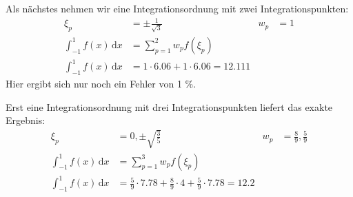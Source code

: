 \documentclass[letterpaper,10pt,german]{jupyterBook}
\begin{document}
\sphinxAtStartPar
Als nächstes nehmen wir eine Integrationsordnung mit zwei Integrationspunkten:
\begin{align*}
\xi_p &= \pm \frac{1}{\sqrt{3}} & w_p &= 1 \\
\int_{-1}^{1} f(x) \, \mathrm{d}x &= \sum_{p=1}^{2} w_p f(\xi_p)  \\
\int_{-1}^{1} f(x) \, \mathrm{d}x &= 1 \cdot 6.06  + 1 \cdot 6.06 = 12.111
\end{align*}
\sphinxAtStartPar
Hier ergibt sich nur noch ein Fehler von 1 \%.

\sphinxAtStartPar
Erst eine Integrationsordnung mit drei Integrationspunkten liefert das exakte Ergebnis:
\begin{align*}
\xi_p &= 0, \pm \sqrt{\frac{3}{5}} & w_p &= \frac{8}{9}, \frac{5}{9} \\
\int_{-1}^{1} f(x) \, \mathrm{d}x &= \sum_{p=1}^{3} w_p f(\xi_p) \\
\int_{-1}^{1} f(x) \, \mathrm{d}x &= \frac{5}{9} \cdot 7.78  + \frac{8}{9} \cdot 4 + \frac{5}{9} \cdot 7.78  = 12.2
\end{align*}
\end{document}
